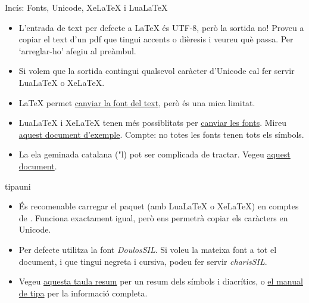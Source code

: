 \begin{frame}[fragile]{Incís: Fonts, Unicode, Xe\LaTeX{} i Lua\LaTeX{}}

\begin{itemize} 
    \item L'entrada de text per defecte a \LaTeX{} és UTF-8, però la sortida no!
    Proveu a copiar el text d'un pdf que tingui accents o dièresis i veureu què passa.
    Per `arreglar-ho' afegiu  al preàmbul.
    \item Si volem que la sortida contingui qualsevol caràcter d'Unicode cal fer servir Lua\LaTeX{} o Xe\LaTeX.
    \item \LaTeX{} permet \href{https://www.overleaf.com/learn/latex/Font_typefaces}{canviar la font del text}, però és una mica limitat. 
    \item Lua\LaTeX{} i Xe\LaTeX{} tenen més possiblitats per \href{https://www.overleaf.com/learn/latex/XeLaTeX}{canviar les fonts}. Mireu \href{https://www.overleaf.com/read/qhjpxrztjjhg\#fa21ab}{aquest document d'exemple}.
    \alert{Compte}: no totes les fonts tenen tots els símbols. 
    \item La ela geminada catalana ("l) pot ser complicada de tractar. Vegeu \href{https://www.overleaf.com/read/qzvfzjwgqwgd#389fd3}{aquest document}.
\end{itemize}
\end{frame}

\begin{frame}[fragile]{tipauni}
\begin{itemize}
    \item És recomenable carregar el paquet  (amb Lua\LaTeX{} o Xe\LaTeX) en comptes de . Funciona exactament igual, però ens permetrà copiar els caràcters en Unicode.
    \item Per defecte utilitza la font \emph{DoulosSIL}. Si voleu la mateixa font a tot el document, i que tingui negreta i cursiva, podeu fer servir \emph{charisSIL}.
    \item Vegeu \href{https://jon.dehdari.org/tutorials/tipachart_mod.pdf}{aquesta taula resum} per un resum dels símbols i diacrítics, o \href{https://ctan.org/pkg/tipa}{el manual de tipa} per la informació completa.
\end{itemize}
\end{frame}


